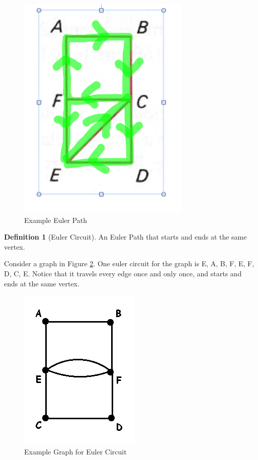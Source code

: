 \documentclass{article}
\theoremstyle{plain}%
\theoremstyle{definition}
\newtheorem{defn}{Definition}[section]
\theoremstyle{remark}
\begin{document}
	\begin{figure}[htbp]
		\center
		\includegraphics[scale=0.4]{img/euler-path.png}
		\caption{Example Euler Path}
		\label{fig-example-euler-path}
	\end{figure}

	\begin{defn}[Euler Circuit]
		An Euler Path that starts and ends at the same vertex.
	\end{defn}

	Consider a graph in Figure \ref{fig-graph-with-euler-circuit}. One euler circuit for the graph is E, A, B, F, E, F, D, C, E. Notice that it travels every edge once and only once, and starts and ends at the same vertex.

	\begin{figure}[htbp]
		\center
		\includegraphics[scale=0.5]{img/euler-circuit-graph.png}
		\caption{Example Graph for Euler Circuit}
		\label{fig-graph-with-euler-circuit}
	\end{figure}
\end{document}
